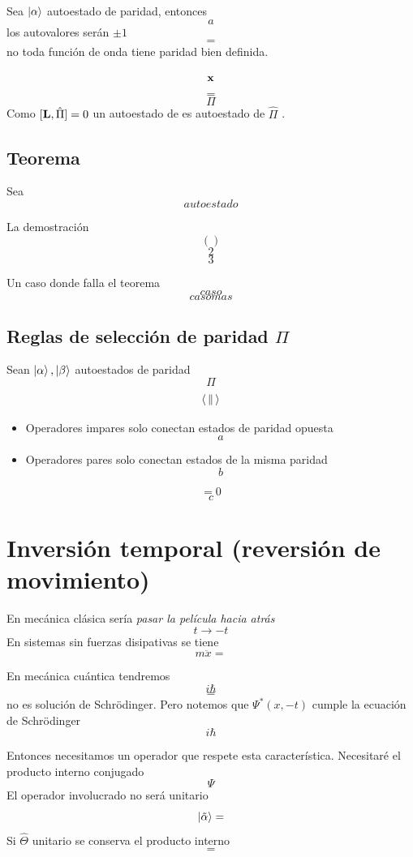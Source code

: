 \documentclass[10pt,oneside]{CBFT_book}
\begin{document}
Sea $\Ket{\alpha}$ autoestado de paridad, entonces 
\[
	a
\]
los autovalores serán $\pm 1$
\[
	=
\]
no toda función de onda tiene paridad bien definida.

\[
	\vb{x}
\]
\[
	=
\]
\[
	\Pi
\]
Como $[\vb{L},\hat{\Pi}]=0$ un autoestado de  es autoestado de $\hat{\Pi}$ .

\subsection{Teorema}

Sea 
\[
	autoestado 
\]

La demostración 
\[
	()
\]
\[
	2
\]
\[
	3
\]

Un caso donde falla el teorema 
\[
	caso
\]
\[
	caso mas
\]

\subsection{Reglas de selección de paridad $\Pi$}

Sean $\Ket{\alpha}, \Ket{\beta}$ autoestados de paridad 
\[
	\Pi
\]
\[
	\Braket{||}
\]

\begin{itemize}
 \item Operadores impares solo conectan estados de paridad opuesta
 \[
	a
 \]
 \item Operadores pares solo conectan estados de la misma paridad 
 \[
	b
 \]
\end{itemize}

\[
	= 0
\]
\[
	c
\]

\section{Inversión temporal (reversión de movimiento)}

En mecánica clásica sería {\it pasar la película hacia atrás}
\[
	t \longrightarrow -t
\]
En sistemas sin fuerzas disipativas se tiene 
\[
	m \ddot{x} =
\]

En mecánica cuántica tendremos 
\[
	i \hbar 
\]
\[
	=
\]
no es solución de Schrödinger. 
Pero notemos que $\Psi^*(x,-t)$ cumple la ecuación de Schrödinger
\[
	i\hbar
\]

Entonces necesitamos un operador que respete esta característica. Necesitaré el producto interno conjugado 
\[
	\Psi
\]
El operador involucrado no será unitario 
\[
	\Ket{\tilde{\alpha}} = 
\]
Si $\hat{\Theta}$ unitario se conserva el producto interno 
\[
	=
\]
\end{document}
